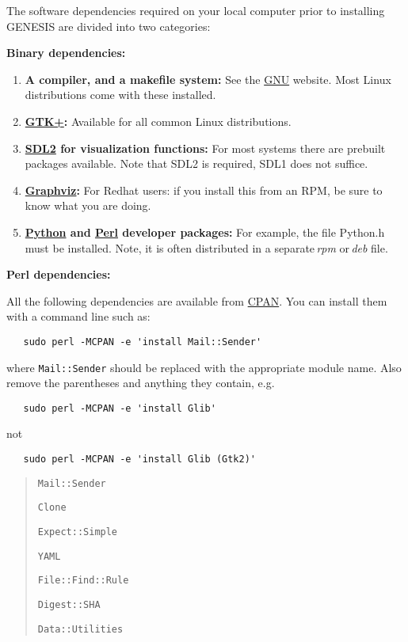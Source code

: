 \documentclass[12pt]{article}
\begin{document}
The software dependencies required on your local computer prior to installing GENESIS  are divided into two categories:
\begin{enumerate}
\item {\bf Binary dependencies:}
\begin{enumerate}
\item {\bf A compiler, and a makefile system:} See the \href{http://www.gnu.org/}{GNU} website. Most Linux distributions come with these installed.
\item {\bf \href{http://www.gtk.org/}{GTK+}:} Available for all common Linux distributions.
\item {\bf \href{http://simpledirectorylisting.net/}{SDL2} for visualization functions:} For most systems there are prebuilt packages available. Note that SDL2 is required, SDL1 does not suffice.
\item {\bf \href{www.graphviz.org}{Graphviz}:} For Redhat users: if you install this from an RPM, be sure to know what you are doing.
\item {\bf  \href{http://www.python.org/}{Python} and  \href{http://www.perl.org/}{Perl} developer packages:} For example, the file Python.h must be installed. Note, it is often distributed in a separate\,{\it rpm} or\,{\it deb} file. 
\end{enumerate}

\item {\bf Perl dependencies:}

All the following dependencies are available from \href{http://search.cpan.org/}{CPAN}. You can install them with a command line such as:
\begin{verbatim}
   sudo perl -MCPAN -e 'install Mail::Sender'
\end{verbatim}
where {\tt Mail::Sender} should be replaced with the appropriate module name. Also remove the parentheses and anything they contain, e.g.
\begin{verbatim}
   sudo perl -MCPAN -e 'install Glib'
\end{verbatim}
not
\begin{verbatim}
   sudo perl -MCPAN -e 'install Glib (Gtk2)'
\end{verbatim}

\begin{quote}
\item {\tt Mail::Sender}
\item {\tt Clone}
\item {\tt Expect::Simple}
\item {\tt YAML}
\item {\tt File::Find::Rule}
\item {\tt Digest::SHA}
\item {\tt Data::Utilities} 


\end{quote}
\end{enumerate}
\end{document}
